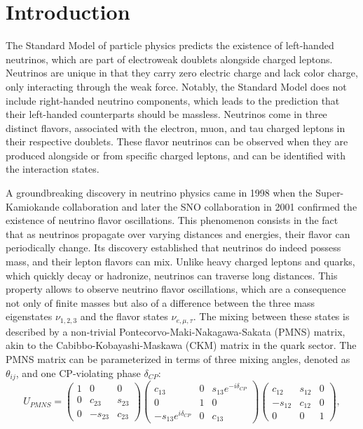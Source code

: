 \chapter*{Introduction}

The Standard Model of particle physics predicts the existence of left-handed neutrinos, which are part of
electroweak doublets alongside charged leptons. Neutrinos are unique in that they carry zero electric charge and lack
color charge, only interacting through the weak force. Notably, the Standard Model does not include right-handed neutrino components, which leads to the prediction that their left-handed counterparts should be massless.
Neutrinos come in three distinct flavors, associated with the electron, muon, and tau charged leptons in their
respective doublets. These flavor neutrinos can be observed when they are produced alongside or from specific charged
leptons, and can be identified with the interaction states.

A groundbreaking discovery in neutrino physics came in 1998 when the Super-Kamiokande collaboration and later the SNO
collaboration in 2001 confirmed the existence of neutrino flavor oscillations. This phenomenon consists in the fact that
as neutrinos propagate over varying distances and energies, their flavor can periodically change. Its discovery established that neutrinos do indeed possess mass, and their lepton flavors can mix.
Unlike heavy charged leptons and quarks, which quickly decay or hadronize, neutrinos 
can traverse long distances. This property allows to observe neutrino flavor oscillations, which are a
consequence not only of finite masses but also of a difference between the three mass eigenstates $\nu_{1,2,3}$ and the
flavor states $\nu_{e,\mu,\tau}$. 
The mixing between these states is described by a non-trivial Pontecorvo-Maki-Nakagawa-Sakata (PMNS) matrix, akin to the
Cabibbo-Kobayashi-Maskawa (CKM) matrix in the quark sector. The PMNS matrix can be parameterized in terms of three
mixing angles, denoted as $\theta_{ij}$, and one CP-violating phase $\delta_{CP}$:
\begin{equation}
U_{PMNS} = \begin{pmatrix}
1 & 0 & 0 \\
0 & c_{23} & s_{23} \\
0 & -s_{23} & c_{23}
\end{pmatrix}
\begin{pmatrix}
c_{13} & 0 & s_{13}e^{-i\delta_{CP}} \\
0 & 1 & 0 \\
-s_{13}e^{i\delta_{CP}} & 0 & c_{13}
\end{pmatrix}
\begin{pmatrix}
c_{12} & s_{12} & 0 \\
-s_{12} & c_{12} & 0 \\
0 & 0 & 1
\end{pmatrix},
\end{equation}

